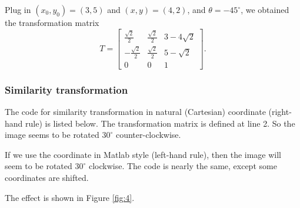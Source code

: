 Plug in \((x_0,y_0)=(3,5)\) and \((x,y)=(4,2)\), and \(\theta=-45^\circ\), we obtained the transformation matrix
\[ T=\begin{bmatrix} \frac{\sqrt{2}}{2} & \frac{\sqrt{2}}{2} & 3-4\sqrt{2} \\ -\frac{\sqrt{2}}{2} & \frac{\sqrt{2}}{2} & 5-\sqrt{2} \\ 0 & 0 & 1 \end{bmatrix}. \]

\subsubsection{Similarity transformation}
The code for similarity transformation in natural (Cartesian) coordinate (right-hand rule) is listed below.
The transformation matrix is defined at line 2.
So the image seems to be rotated \(30^\circ\) counter-clockwise.

If we use the coordinate in Matlab style (left-hand rule), then the image will seem to be rotated \(30^\circ\) clockwise.
The code is nearly the same, except some coordinates are shifted.

The effect is shown in Figure \ref{fig:4}.
